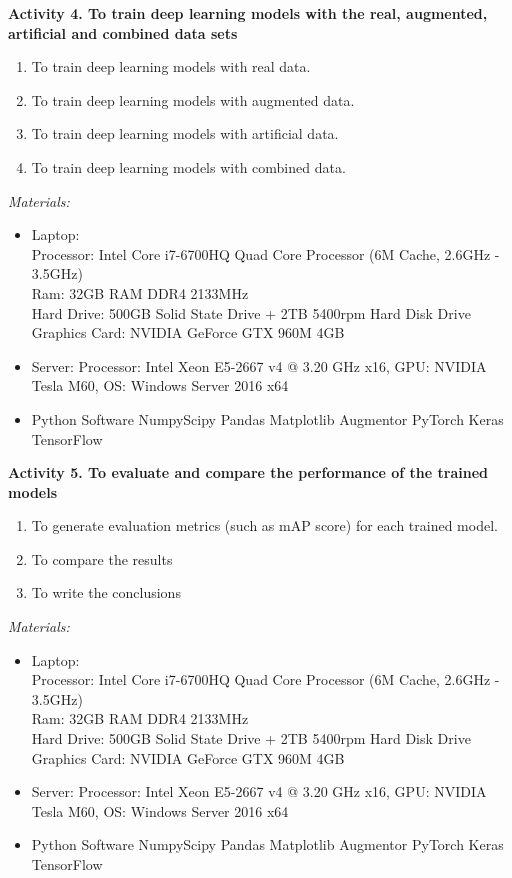 \textbf{Activity 4. To train deep learning models with the real, augmented, artificial and combined data sets}

\begin{enumerate}
	\item To train deep learning models with real data.
	\item To train deep learning models with augmented data.
	\item To train deep learning models with artificial data.
	\item To train deep learning models with combined data.
\end{enumerate}
\emph{Materials:}
    \begin{itemize}
    \item Laptop:\\Processor: Intel Core i7-6700HQ Quad Core Processor (6M Cache, 2.6GHz - 3.5GHz)\\Ram: 32GB RAM DDR4 2133MHz \\ Hard Drive: 500GB Solid State Drive + 2TB 5400rpm Hard Disk Drive \\ Graphics Card: NVIDIA GeForce GTX 960M 4GB
    \item  Server: Processor: Intel Xeon E5-2667 v4 @ 3.20 GHz  x16, GPU: NVIDIA Tesla M60, OS: Windows Server 2016 x64 
    \item Python Software
    \subitem Numpy\subitem Scipy \subitem Pandas \subitem Matplotlib  \subitem Augmentor \subitem PyTorch \subitem Keras \subitem TensorFlow
\end{itemize}

\textbf{Activity 5. To evaluate and compare the performance of the trained models}

\begin{enumerate}
	\item To generate evaluation metrics (such as mAP score) for each trained model.
	\item To compare the results
	\item To write the conclusions
\end{enumerate}
\emph{Materials:}
    \begin{itemize}
    \item Laptop:\\Processor: Intel Core i7-6700HQ Quad Core Processor (6M Cache, 2.6GHz - 3.5GHz)\\Ram: 32GB RAM DDR4 2133MHz \\ Hard Drive: 500GB Solid State Drive + 2TB 5400rpm Hard Disk Drive \\ Graphics Card: NVIDIA GeForce GTX 960M 4GB
    \item  Server: Processor: Intel Xeon E5-2667 v4 @ 3.20 GHz  x16, GPU: NVIDIA Tesla M60, OS: Windows Server 2016 x64 
    \item Python Software
    \subitem Numpy\subitem Scipy \subitem Pandas \subitem Matplotlib  \subitem Augmentor \subitem PyTorch \subitem Keras \subitem TensorFlow
\end{itemize}
